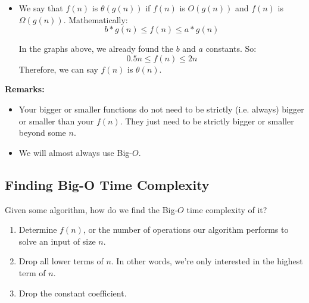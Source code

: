 \documentclass[letterpaper]{article}
\begin{document}
\begin{itemize}
    \item We say that $f(n)$ is $\theta(g(n))$ if $f(n)$ is $O(g(n))$ and $f(n)$ is $\Omega(g(n))$. Mathematically: 
    \[b * g(n) \leq f(n) \leq a * g(n)\]
    
    In the graphs above, we already found the $b$ and $a$ constants. So:
    \[0.5n \leq f(n) \leq 2n\]
    Therefore, we can say $f(n)$ is $\theta(n)$.
\end{itemize}

\textbf{Remarks:} 
\begin{itemize}
    \item Your bigger or smaller functions do not need to be strictly (i.e. always) bigger or smaller than your $f(n)$. They just need to be strictly bigger or smaller beyond some $n$.
    \item We will almost always use Big-$O$. 
\end{itemize}

\subsection{Finding Big-O Time Complexity}
Given some algorithm, how do we find the Big-$O$ time complexity of it? 
\begin{enumerate}[1)]
    \item Determine $f(n)$, or the number of operations our algorithm performs to solve an input of size $n$.
    \item Drop all lower terms of $n$. In other words, we're only interested in the highest term of $n$.
    \item Drop the constant coefficient. 
\end{enumerate}
\end{document}
